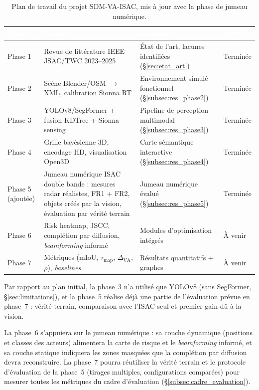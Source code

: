 \documentclass[12pt,a4paper,titlepage]{article}
\newcommand{\hd}[1]{\textcolor{white}{\textbf{#1}}}
\newcommand{\choix}{\rowcolor{tabchoice}}
\begin{document}
\begin{table}[H]
    \centering
    \caption{Plan de travail du projet SDM-VA-ISAC, mis à jour avec la phase de jumeau numérique.}
    \label{tab:feuille_route}
    \begin{tabularx}{\textwidth}{>{\centering\arraybackslash}p{1.6cm}LL>{\centering\arraybackslash}p{2.1cm}}
        \toprule
        \hd{Phase} & \hd{Tâches} & \hd{Livrables} & \hd{Statut} \\
        \midrule
        Phase 1 & Revue de littérature IEEE JSAC/TWC 2023--2025 & État de l'art, lacunes identifiées (\S\ref{sec:etat_art}) & Terminée \\
        Phase 2 & Scène Blender/OSM $\to$ XML, calibration Sionna RT & Environnement simulé fonctionnel (\S\ref{subsec:res_phase2}) & Terminée \\
        Phase 3 & YOLOv8/SegFormer + fusion KDTree + Sionna sensing & Pipeline de perception multimodal (\S\ref{subsec:res_phase3}) & Terminée \\
        Phase 4 & Grille bayésienne 3D, encodage HD, visualisation Open3D & Carte sémantique interactive (\S\ref{subsec:res_phase4}) & Terminée \\
        Phase 5 \newline \footnotesize(ajoutée) & Jumeau numérique ISAC double bande : mesures radar réalistes, FR1 + FR2, objets créés par la vision, évaluation par vérité terrain & Jumeau numérique évalué (\S\ref{subsec:res_phase5}) & Terminée \\
        \choix Phase 6 & Risk heatmap, JSCC, complétion par diffusion, \textit{beamforming} informé & Modules d'optimisation intégrés & À venir \\
        \choix Phase 7 & Métriques (mIoU, $\tau_{\text{map}}$, $\Delta_{\text{VA}}$, $\rho$), \textit{baselines} & Résultats quantitatifs + graphes & À venir \\
        \bottomrule
    \end{tabularx}
\end{table}

Par rapport au plan initial, la phase~3 n'a utilisé que YOLOv8 (sans SegFormer, \S\ref{sec:limitations}), et la phase~5 réalise déjà une partie de l'évaluation prévue en phase~7 : vérité terrain, comparaison avec l'ISAC seul et premier gain dû à la vision.

La phase~6 s'appuiera sur le jumeau numérique : sa couche dynamique (positions et classes des acteurs) alimentera la carte de risque et le \textit{beamforming} informé, et sa couche statique indiquera les zones masquées que la complétion par diffusion devra reconstruire. La phase~7 pourra réutiliser la vérité terrain et le protocole d'évaluation de la phase~5 (tirages multiples, configurations comparées) pour mesurer toutes les métriques du cadre d'évaluation (\S\ref{subsec:cadre_evaluation}).
\end{document}
